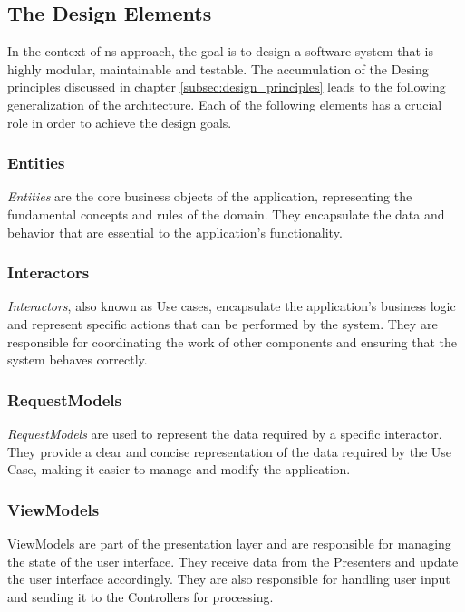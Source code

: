 \subsection{The Design Elements} \label{subsec:design_elements}

In the context of \gls{ns} approach, the goal is to design a software system that is highly
modular, maintainable and testable. The accumulation of the Desing principles discussed
in chapter \ref{subsec:design_principles} leads to the following generalization of the
architecture. Each of the following elements has a crucial role in order to achieve the
design goals.

\subsubsection{Entities}
\textit{Entities} are the core business objects of the application, representing the fundamental
concepts and rules of the domain. They encapsulate the data and behavior that are
essential to the application's functionality.

\subsubsection{Interactors}
\textit{Interactors}, also known as Use cases, encapsulate the application's business
logic and represent specific actions that can be performed by the system. They are
responsible for coordinating the work of other components and ensuring that the system
behaves correctly.

\subsubsection{RequestModels}
\textit{RequestModels} are used to represent the data required by a specific interactor. They
provide a clear and concise representation of the data required by the Use Case, making it
easier to manage and modify the application.

\subsubsection{ViewModels}
ViewModels are part of the presentation layer and are responsible for managing the state
of the user interface. They receive data from the Presenters and update the user interface
accordingly. They are also responsible for handling user input and sending it to the
Controllers for processing.

